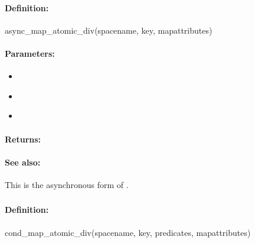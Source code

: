 \paragraph{Definition:}
\begin{rubycode}
async_map_atomic_div(spacename, key, mapattributes)
\end{rubycode}

\paragraph{Parameters:}
\begin{itemize}[noitemsep]
\item {}\\

\item {}\\

\item {}\\

\end{itemize}

\paragraph{Returns:}


\paragraph{See also:}  This is the asynchronous form of .

\pagebreak
\subsubsection{}
\label{api:ruby:cond_map_atomic_div}


\paragraph{Definition:}
\begin{rubycode}
cond_map_atomic_div(spacename, key, predicates, mapattributes)
\end{rubycode}

